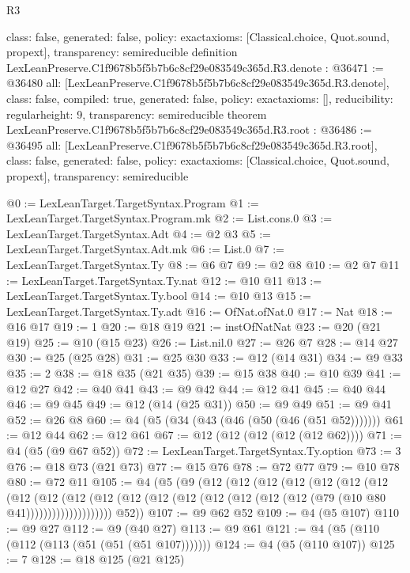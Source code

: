 \begin{lexlean}{R3}
\begin{coremodule}
{  class: false,
  generated: false,
  policy: exact{axioms: [Classical.choice, Quot.sound, propext]},
  transparency: semireducible
}
definition LexLeanPreserve.C1f9678b5f5b7b6c8cf29e083549c365d.R3.denote : @36471 := @36480 {
  all: [LexLeanPreserve.C1f9678b5f5b7b6c8cf29e083549c365d.R3.denote],
  class: false,
  compiled: true,
  generated: false,
  policy: exact{axioms: []},
  reducibility: regular{height: 9},
  transparency: semireducible
}
theorem LexLeanPreserve.C1f9678b5f5b7b6c8cf29e083549c365d.R3.root : @36486 := @36495 {
  all: [LexLeanPreserve.C1f9678b5f5b7b6c8cf29e083549c365d.R3.root],
  class: false,
  generated: false,
  policy: exact{axioms: [Classical.choice, Quot.sound, propext]},
  transparency: semireducible
}

@0 := LexLeanTarget.TargetSyntax.Program
@1 := LexLeanTarget.TargetSyntax.Program.mk
@2 := List.cons.{0}
@3 := LexLeanTarget.TargetSyntax.Adt
@4 := @2 @3
@5 := LexLeanTarget.TargetSyntax.Adt.mk
@6 := List.{0}
@7 := LexLeanTarget.TargetSyntax.Ty
@8 := @6 @7
@9 := @2 @8
@10 := @2 @7
@11 := LexLeanTarget.TargetSyntax.Ty.nat
@12 := @10 @11
@13 := LexLeanTarget.TargetSyntax.Ty.bool
@14 := @10 @13
@15 := LexLeanTarget.TargetSyntax.Ty.adt
@16 := OfNat.ofNat.{0}
@17 := Nat
@18 := @16 @17
@19 := 1
@20 := @18 @19
@21 := instOfNatNat
@23 := @20 (@21 @19)
@25 := @10 (@15 @23)
@26 := List.nil.{0}
@27 := @26 @7
@28 := @14 @27
@30 := @25 (@25 @28)
@31 := @25 @30
@33 := @12 (@14 @31)
@34 := @9 @33
@35 := 2
@38 := @18 @35 (@21 @35)
@39 := @15 @38
@40 := @10 @39
@41 := @12 @27
@42 := @40 @41
@43 := @9 @42
@44 := @12 @41
@45 := @40 @44
@46 := @9 @45
@49 := @12 (@14 (@25 @31))
@50 := @9 @49
@51 := @9 @41
@52 := @26 @8
@60 := @4 (@5 (@34 (@43 (@46 (@50 (@46 (@51 @52)))))))
@61 := @12 @44
@62 := @12 @61
@67 := @12 (@12 (@12 (@12 (@12 @62))))
@71 := @4 (@5 (@9 @67 @52))
@72 := LexLeanTarget.TargetSyntax.Ty.option
@73 := 3
@76 := @18 @73 (@21 @73)
@77 := @15 @76
@78 := @72 @77
@79 := @10 @78
@80 := @72 @11
@105 := @4
    (@5
      (@9
        (@12
          (@12
            (@12
              (@12
                (@12
                  (@12
                    (@12
                      (@12
                        (@12
                          (@12
                            (@12
                              (@12
                                (@12 (@12 (@12 (@12 (@12 (@12 (@79 (@10 @80 @41))))))))))))))))))))
        @52))
@107 := @9 @62 @52
@109 := @4 (@5 @107)
@110 := @9 @27
@112 := @9 (@40 @27)
@113 := @9 @61
@121 := @4 (@5 (@110 (@112 (@113 (@51 (@51 (@51 @107)))))))
@124 := @4 (@5 (@110 @107))
@125 := 7
@128 := @18 @125 (@21 @125)

\end{coremodule}
\end{lexlean}
